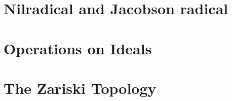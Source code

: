 \section{Nilradical and Jacobson radical}
\section{Operations on Ideals}
\section{The Zariski Topology}